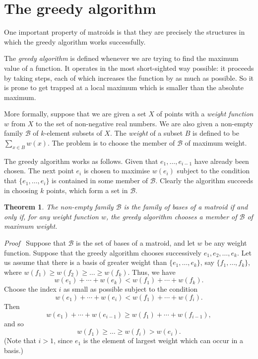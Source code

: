 \documentclass[12pt]{article}
\newtheorem{theorem}{Theorem}[section]
\newcommand{\head}[1]{\medbreak\noindent\textit{#1}\ }
\begin{document}
\section{The greedy algorithm}

One important property of matroids is that they are precisely
the structures in which the greedy algorithm works successfully.

The \emph{greedy algorithm} is defined whenever we are trying
to find the maximum value of a function. It operates in the most
short-sighted way possible: it proceeds by taking steps, each
of which increases the function by as much as possible. So it is
prone to get trapped at a local maximum which is smaller than
the absolute maximum.

More formally, suppose that we are given a set $X$ of points with
a \emph{weight function} $w$ from $X$ to the set of non-negative
real numbers. We are also given a non-empty family $\mathcal{B}$ of
$k$-element subsets of $X$. The \emph{weight} of a subset $B$ is
defined to be $\sum_{x\in B}w(x)$. The problem is to choose the
member of $\mathcal{B}$ of maximum weight.

The greedy algorithm works as follows. Given that $e_1, \ldots,
e_{i-1}$ have already been chosen. The next point $e_i$ is chosen
to maximise $w(e_i)$ subject to the condition that $\{e_1, \ldots,
e_i\}$ is contained in some member of $\mathcal{B}$. Clearly the
algorithm succeeds in choosing $k$ points, which form a set in
$\mathcal{B}$.

\begin{theorem}
The non-empty family $\mathcal{B}$ is the family of bases of a
matroid if and only if, for any weight function $w$, the greedy
algorithm chooses a member of $\mathcal{B}$ of maximum weight.
\end{theorem}

\head{Proof} Suppose that $\mathcal{B}$ is the set of bases
of a matroid, and let $w$ be any weight function. Suppose that
the greedy algorithm chooses successively $e_1,e_2, \ldots, e_k$.
Let us assume that there is a basis of greater weight than
$\{e_1, \ldots, e_k\}$, say $\{f_1, \ldots, f_k\}$, where
$w(f_1)\ge w(f_2)\ge\ldots\ge w(f_k)$. Thus, we have
\[w(e_1)+\cdots+w(e_k)<w(f_1)+\cdots+w(f_k).\]
Choose the index $i$ as small as possible subject to the condition
\[w(e_1)+\cdots+w(e_i)<w(f_1)+\cdots+w(f_i).\]
Then
\[w(e_1)+\cdots+w(e_{i-1})\ge w(f_1)+\cdots+w(f_{i-1}),\]
and so
\[w(f_1)\ge\ldots\ge w(f_i)>w(e_i).\]
(Note that $i>1$, since $e_1$ is the element of largest weight which
can occur in a basis.)
\end{document}
